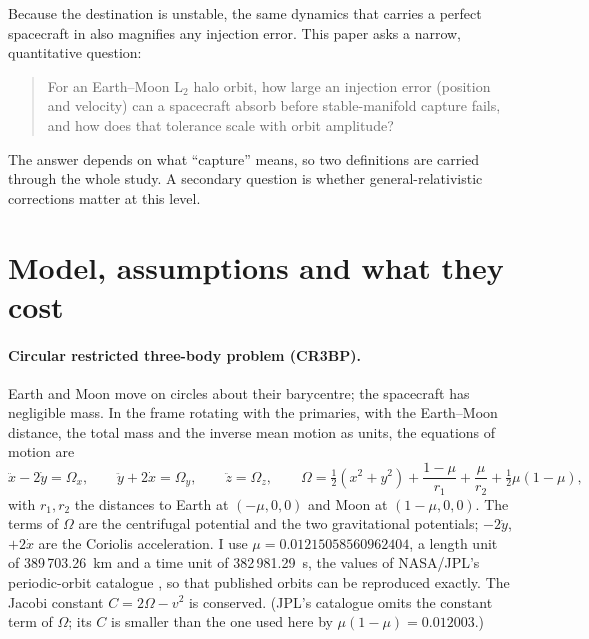 \documentclass[11pt,a4paper]{article}
\newcommand{\mum}{\mu}
\begin{document}
Because the destination is unstable, the same dynamics that carries a perfect spacecraft in also magnifies
any injection error. This paper asks a narrow, quantitative question:
\begin{quote}
For an Earth--Moon L$_2$ halo orbit, how large an injection error (position and velocity) can a spacecraft
absorb before stable-manifold capture fails, and how does that tolerance scale with orbit amplitude?
\end{quote}
The answer depends on what ``capture'' means, so two definitions are carried through the whole study. A
secondary question is whether general-relativistic corrections matter at this level.

\section{Model, assumptions and what they cost}\label{sec:model}
\paragraph{Circular restricted three-body problem (CR3BP).} Earth and Moon move on circles about their
barycentre; the spacecraft has negligible mass. In the frame rotating with the primaries, with the
Earth--Moon distance, the total mass and the inverse mean motion as units, the equations of motion are
\cite{koon,szebehely}
\begin{equation}
\ddot x-2\dot y=\Omega_x,\qquad \ddot y+2\dot x=\Omega_y,\qquad \ddot z=\Omega_z,\qquad
\Omega=\tfrac12(x^2+y^2)+\frac{1-\mum}{r_1}+\frac{\mum}{r_2}+\tfrac12\mum(1-\mum),
\end{equation}
with $r_1,r_2$ the distances to Earth at $(-\mum,0,0)$ and Moon at $(1-\mum,0,0)$. The terms of $\Omega$ are the
centrifugal potential and the two gravitational potentials; $-2\dot y$, $+2\dot x$ are the Coriolis
acceleration. I use $\mum=0.01215058560962404$, a length unit of 389\,703.26~km and a time unit of
382\,981.29~s, the values of NASA/JPL's periodic-orbit catalogue \cite{jplapi}, so that published orbits can
be reproduced exactly. The Jacobi constant $C=2\Omega-v^2$ is conserved. (JPL's catalogue omits the
constant term of $\Omega$; its $C$ is smaller than the one used here by $\mum(1-\mum)=0.012003$.)
\end{document}
